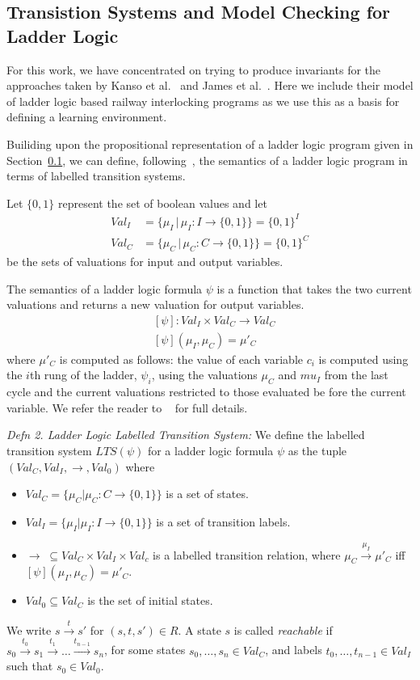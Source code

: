 \documentclass[conference,compsoc]{IEEEtran}
\begin{document}
\subsection{Transistion Systems and Model Checking for Ladder Logic}
For this work, we have concentrated on trying to produce invariants for the approaches taken by Kanso et al.~\cite{kanso2009automated} and James et al.~\cite{james2013verification}. Here we include their model of ladder logic based railway interlocking programs as we use this as a basis for defining a learning environment.

Builiding upon the propositional representation of a ladder logic program given in Section~\ref{}, we can define, following~\cite{sefm14}, the semantics of a ladder logic program in terms of labelled transition systems.

Let $\{0,1\}$ represent the set of boolean values and let
\begin{align*}
 Val_I  &= \{ \mu_I \, | \, \mu_I : I \to \{0 , 1 \} \}  = \{0,1 \}^I   \\
 Val_C &=  \{ \mu_C \, | \, \mu_C : C \to \{ 0 , 1 \} \} = \{ 0,1 \}^C 
\end{align*}
be the sets of valuations for input and output variables.

The semantics of a ladder logic formula $\psi$ is a function that takes the two current valuations and returns a new
valuation for output variables.
\begin{align*}
 & [ \psi ] : Val_I \times Val_C \to  Val_C \\
 & [ \psi ] ( \mu_I, \mu_C ) = \mu'_C 
\end{align*}
where $\mu'_C$ is computed as follows: the value of each variable $c_i$ is computed using the $i$th rung of the ladder, $\psi_i$, using the valuations $\mu_C$ and $mu_I$ from the last cycle and the current valuations restricted to those evaluated be fore the current variable. We refer the reader to ~\cite{sefm14} for full details.

\textit{Defn 2. Ladder Logic Labelled Transition System:}
We define the labelled transition system $LTS(\psi)$ for a ladder logic formula $\psi$ as the tuple $(Val_C,Val_I,\rightarrow, Val_0)$ where
\begin{itemize}
\item $Val_C = \{ \mu_C | \mu_C : C \to \{ 0 , 1 \} \}$ is a set of states.
\item $Val_I = \{ \mu_I | \mu_I : I \to \{0 , 1 \} \}$ is a set of transition labels.
\item $\rightarrow \; \subseteq Val_C \times Val_I \times Val_c $ is a labelled transition relation, where $\mu_C \xrightarrow{\mu_I} \mu'_C$ iff  $[ \psi ] ( \mu_I , \mu_C) = \mu'_C$.
\item $ Val_0 \subseteq Val_C$ is the set of initial states.

\end{itemize}
%
We write $ s \xrightarrow{t} s'$ for $(s,t,s')\in R$.
A state $s$ is called \emph{reachable} if 
$s_0 \xrightarrow{t_0} s_{1} \xrightarrow{t_1} \ldots 
\xrightarrow{t_{n-1}} s_n$,  
for some states $s_0,\ldots, s_{n} \in Val_C$, and 
labels $t_0, \ldots, t_{n-1} \in Val_I$ such that
$s_0 \in Val_0$.  
\end{document}

